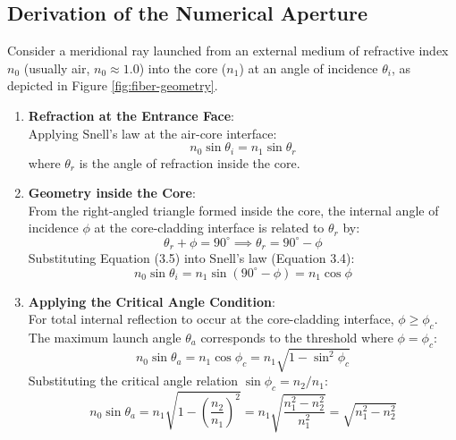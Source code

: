 \subsection{Derivation of the Numerical Aperture}
Consider a meridional ray launched from an external medium of refractive index $n_0$ (usually air, $n_0 \approx 1.0$) into the core ($n_1$) at an angle of incidence $\theta_i$, as depicted in Figure \ref{fig:fiber-geometry}.

\begin{enumerate}
    \item \textbf{Refraction at the Entrance Face}:\\
    Applying Snell's law at the air-core interface:
    \begin{equation}
        n_0 \sin\theta_i = n_1 \sin\theta_r
    \end{equation}
    where $\theta_r$ is the angle of refraction inside the core.
    
    \item \textbf{Geometry inside the Core}:\\
    From the right-angled triangle formed inside the core, the internal angle of incidence $\phi$ at the core-cladding interface is related to $\theta_r$ by:
    \begin{equation}
        \theta_r + \phi = 90^\circ \implies \theta_r = 90^\circ - \phi
    \end{equation}
    Substituting Equation (3.5) into Snell's law (Equation 3.4):
    \begin{equation}
        n_0 \sin\theta_i = n_1 \sin(90^\circ - \phi) = n_1 \cos\phi
    \end{equation}
    
    \item \textbf{Applying the Critical Angle Condition}:\\
    For total internal reflection to occur at the core-cladding interface, $\phi \ge \phi_c$. The maximum launch angle $\theta_a$ corresponds to the threshold where $\phi = \phi_c$:
    \begin{equation}
        n_0 \sin\theta_a = n_1 \cos\phi_c = n_1 \sqrt{1 - \sin^2\phi_c}
    \end{equation}
    Substituting the critical angle relation $\sin\phi_c = n_2 / n_1$:
    \begin{equation}
        n_0 \sin\theta_a = n_1 \sqrt{1 - \left(\frac{n_2}{n_1}\right)^2} = n_1 \sqrt{\frac{n_1^2 - n_2^2}{n_1^2}} = \sqrt{n_1^2 - n_2^2}
    \end{equation}
\end{enumerate}

